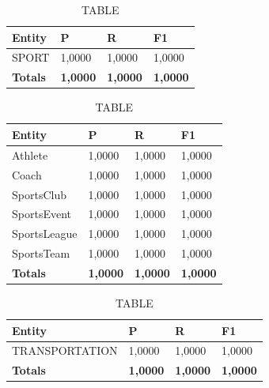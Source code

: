 \documentclass[thesis=M,english]{FITthesis}[2018/05/30]
\begin{document}
	\begin{table}[H]\centering
		\caption{TABLE}
		\label{}
		\begin{tabular}{|l|l|l|l|}
			\hline {\textbf{Entity}} & {\textbf{P}} & {\textbf{R}} & {\textbf{F1}}\\\hline
				SPORT & 1,0000 & 1,0000 & 1,0000\\\hline
				\textbf{Totals} & \textbf{1,0000} & \textbf{1,0000} & \textbf{1,0000}\\\hline
		\end{tabular}
	\end{table}	

	\begin{table}[H]\centering
		\caption{TABLE}
		\label{}
		\begin{tabular}{|l|l|l|l|}
			\hline {\textbf{Entity}} & {\textbf{P}} & {\textbf{R}} & {\textbf{F1}}\\\hline
				Athlete & 1,0000 & 1,0000 & 1,0000\\
				Coach & 1,0000 & 1,0000 & 1,0000\\
				SportsClub & 1,0000 & 1,0000 & 1,0000\\
				SportsEvent & 1,0000 & 1,0000 & 1,0000\\
				SportsLeague & 1,0000 & 1,0000 & 1,0000\\
				SportsTeam & 1,0000 & 1,0000 & 1,0000\\\hline
				\textbf{Totals} & \textbf{1,0000} & \textbf{1,0000} & \textbf{1,0000}\\\hline
		\end{tabular}
	\end{table}	

	
	
	\begin{table}[H]\centering
		\caption{TABLE}
		\label{}
		\begin{tabular}{|l|l|l|l|}
			\hline {\textbf{Entity}} & {\textbf{P}} & {\textbf{R}} & {\textbf{F1}}\\\hline
				TRANSPORTATION & 1,0000 & 1,0000 & 1,0000\\\hline
				\textbf{Totals} & \textbf{1,0000} & \textbf{1,0000} & \textbf{1,0000}\\\hline
		\end{tabular}
	\end{table}
\end{document}
